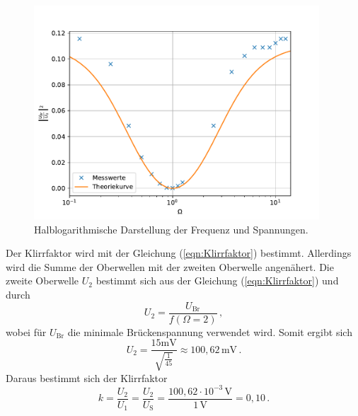 \begin{figure}[H]
  \centering
  \includegraphics[width=0.95\textwidth]{plot.pdf}
  \caption{Halblogarithmische Darstellung der Frequenz und Spannungen.}
  \label{fig:WienRobinson}
\end{figure}
Der Klirrfaktor wird mit der Gleichung (\ref{eqn:Klirrfaktor}) bestimmt. Allerdings wird die Summe der Oberwellen mit der zweiten Oberwelle angenähert.
Die zweite Oberwelle $U_2$ bestimmt sich aus der Gleichung (\ref{eqn:Klirrfaktor}) und durch
$$U_2 = \frac{U_{\text{Br}}}{f(\Omega = 2)}\,,$$
wobei für $U_{\text{Br}}$ die minimale Brückenspannung verwendet wird. Somit ergibt sich 
$$U_2 = \frac{15\unit{\milli\volt}}{\sqrt{\frac{1}{45}}} \approx 100,62\,\unit{\milli\volt}\,.$$
Daraus bestimmt sich der Klirrfaktor
$$k = \frac{U_2}{U_1} = \frac{U_2}{U_{\text{S}}}= \frac{100,62 \cdot 10^{-3}\,\unit{\volt}}{1\,\unit{\volt}} = 0,10\,.$$